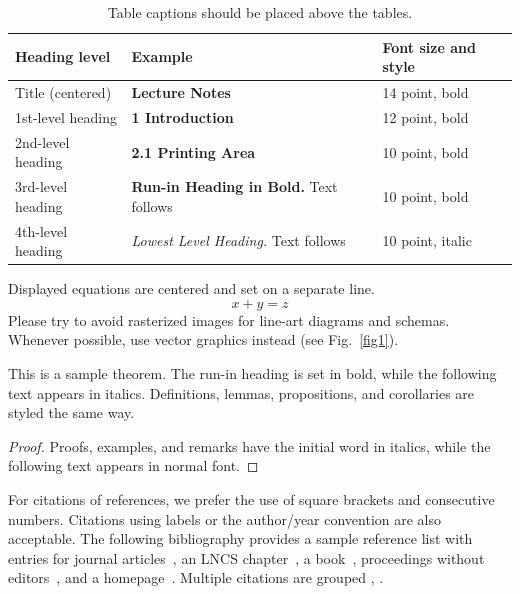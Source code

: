 \documentclass[runningheads]{llncs}
\begin{document}
\begin{table}
\caption{Table captions should be placed above the
tables.}\label{tab1}
\begin{tabular}{|l|l|l|}
\hline
Heading level &  Example & Font size and style\\
\hline
Title (centered) &  {\Large\bfseries Lecture Notes} & 14 point, bold\\
1st-level heading &  {\large\bfseries 1 Introduction} & 12 point, bold\\
2nd-level heading & {\bfseries 2.1 Printing Area} & 10 point, bold\\
3rd-level heading & {\bfseries Run-in Heading in Bold.} Text follows & 10 point, bold\\
4th-level heading & {\itshape Lowest Level Heading.} Text follows & 10 point, italic\\
\hline
\end{tabular}
\end{table}


\noindent Displayed equations are centered and set on a separate
line.
\begin{equation}
x + y = z
\end{equation}
Please try to avoid rasterized images for line-art diagrams and
schemas. Whenever possible, use vector graphics instead (see
Fig.~\ref{fig1}).



\begin{theorem}
This is a sample theorem. The run-in heading is set in bold, while
the following text appears in italics. Definitions, lemmas,
propositions, and corollaries are styled the same way.
\end{theorem}
%
%
\begin{proof}
Proofs, examples, and remarks have the initial word in italics,
while the following text appears in normal font.
\end{proof}
For citations of references, we prefer the use of square brackets
and consecutive numbers. Citations using labels or the author/year
convention are also acceptable. The following bibliography provides
a sample reference list with entries for journal
articles~\cite{ref_article1}, an LNCS chapter~\cite{ref_lncs1}, a
book~\cite{ref_book1}, proceedings without editors~\cite{ref_proc1},
and a homepage~\cite{ref_url1}. Multiple citations are grouped
\cite{ref_article1,ref_lncs1,ref_book1},
\cite{ref_article1,ref_book1,ref_proc1,ref_url1}.
\end{document}
